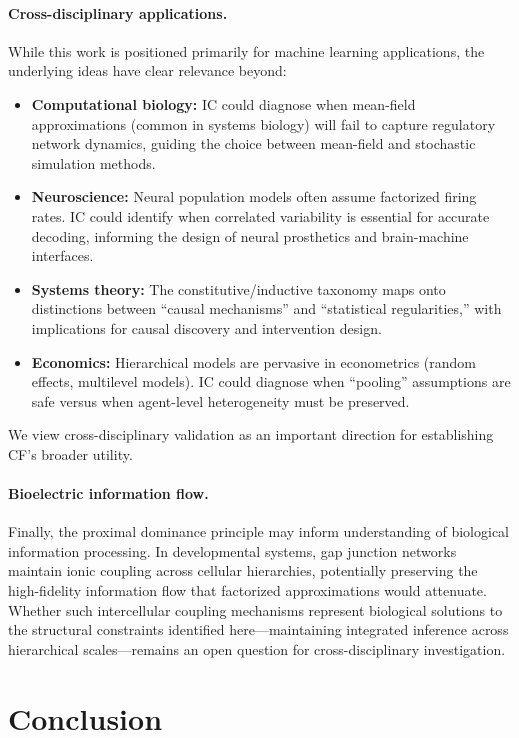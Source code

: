 \documentclass[10pt]{article} %
\theoremstyle{plain}
\theoremstyle{definition}
\begin{document}
\paragraph{Cross-disciplinary applications.} While this work is positioned primarily for machine learning applications, the underlying ideas have clear relevance beyond:
\begin{itemize}
    \item \textbf{Computational biology:} IC could diagnose when mean-field approximations (common in systems biology) will fail to capture regulatory network dynamics, guiding the choice between mean-field and stochastic simulation methods.
    \item \textbf{Neuroscience:} Neural population models often assume factorized firing rates. IC could identify when correlated variability is essential for accurate decoding, informing the design of neural prosthetics and brain-machine interfaces.
    \item \textbf{Systems theory:} The constitutive/inductive taxonomy maps onto distinctions between ``causal mechanisms'' and ``statistical regularities,'' with implications for causal discovery and intervention design.
    \item \textbf{Economics:} Hierarchical models are pervasive in econometrics (random effects, multilevel models). IC could diagnose when ``pooling'' assumptions are safe versus when agent-level heterogeneity must be preserved.
\end{itemize}
We view cross-disciplinary validation as an important direction for establishing CF's broader utility.

\paragraph{Bioelectric information flow.} Finally, the proximal dominance principle may inform understanding of biological information processing. In developmental systems, gap junction networks maintain ionic coupling across cellular hierarchies, potentially preserving the high-fidelity information flow that factorized approximations would attenuate. Whether such intercellular coupling mechanisms represent biological solutions to the structural constraints identified here---maintaining integrated inference across hierarchical scales---remains an open question for cross-disciplinary investigation.

\section{Conclusion}
\label{sec:conclusion}
\end{document}
